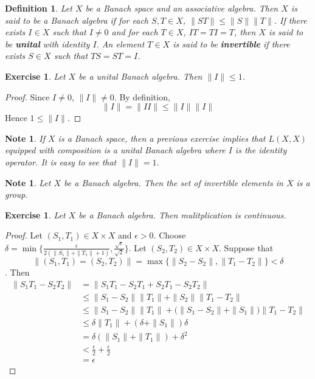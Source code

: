\documentclass[12pt]{amsart}
\newtheorem{defn}[thm]{Definition}
\newtheorem{note}[thm]{Note}
\newtheorem{ex}[thm]{Exercise}
\newcommand{\del}{\delta}
\newcommand{\ep}{\epsilon}
\begin{document}
	\begin{defn}
		Let $X$ be a Banach space and an associative algebra. Then $X$ is said to be a Banach algebra if for each $S,T \in X$, $\|ST \|\leq \|S \|\|T \|$. If there exists $I \in X$ such that $I \neq 0$ and for each $T \in X$, $IT = TI = T$, then $X$ is said to be \textbf{unital} with identity $I$. An element $T \in X$ is said to be \textbf{invertible} if there exists $S \in X$ such that $TS=ST = I$.
	\end{defn}
	
	\begin{ex}
		Let $X$ be a unital Banach algebra. Then $\|I \|\leq 1$. 
	\end{ex}
	
	\begin{proof}
		Since $I \neq 0$, $\|I \|\neq 0$. By definition, $$\|I \|= \|I I \|\leq \|I \|\|I \|$$ Hence $1 \leq \|I \|$.
	\end{proof}
	
	\begin{note}
		If $X$ is a Banach space, then a previous exercise implies that $L(X,X)$ equipped with composition is a unital Banach algebra where $I$ is the identity operator. It is easy to see that $\|I \|=1$.
	\end{note}
	
	\begin{note}
		Let $X$ be a  Banach algebra. Then the set of invertible elements in $X$ is a group.  
	\end{note}
	
	\begin{ex}
		Let $X$ be a Banach algebra. Then mulitplication is continuous. 
	\end{ex}
	
	\begin{proof}
		Let $(S_1,T_1) \in X \times X$ and $\ep > 0$. Choose $\del = \min\{\frac{\ep}{2(\|S_1 \|+ \|T_1 \|+1)}, \frac{\sqrt{\ep}}{\sqrt{2}}\}$. Let $(S_2, T_2) \in X \times X$. Suppose that $$\|(S_1, T_1) = (S_2, T_2) \|= \max \{ \|S_2 -S_2 \|, \|T_1 - T_2 \|\} < \del$$. Then 
		\begin{align*}
			\|S_1T_1 - S_2T_2 \|
			&= \|S_1T_1 - S_2T_1 +S_2T_1 - S_2T_2 \|\\
			& \leq \|S_1 -S_2 \|\|T_1 \|+ \|S_2 \|\|T_1 - T_2 \|\\
			& \leq \|S_1 -S_2 \|\|T_1 \|+ \big( \|S_1-S_2 \|+ \|S_1 \|\big) \|T_1 - T_2 \|\\
			& \leq \del \|T_1 \|+(\del + \|S_1 \|) \del \\
			&= \del (\|S_1 \|+ \|T_1 \|) + \del^2 \\
			& < \frac{\ep}{2} + \frac{\ep}{2}\\
			&= \ep
		\end{align*}
	\end{proof}
	
\end{document}
